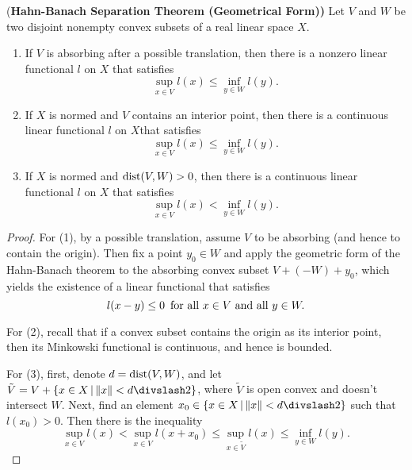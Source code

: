 \begin{theorem}{(\bf Hahn-Banach Separation Theorem (Geometrical Form))}
  Let $V$ and $W$ be two disjoint nonempty convex subsets of a real linear space $X$.
  \begin{enumerate}
    \item If $V$ is absorbing after a possible translation, then there is a nonzero linear functional $l$ on $X$ that satisfies
    \begin{equation*}
        \sup_{x\in V}l(x)\leq\inf_{y\in W}l(y).
      \end{equation*}
    \item If $X$ is normed and $V$ contains an interior point, then there is a continuous linear functional $l$ on $X$that satisfies
    \begin{equation*}
      \sup_{x\in V}l(x)\leq\inf_{y\in W}l(y).
    \end{equation*}
    \item If $X$ is normed and $\operatorname{dist}(V, W)>0$, then there is a continuous linear functional $l$ on $X$ that satisfies
    \begin{equation*}
      \sup_{x\in V}l(x)<\inf_{y\in W}l(y).
    \end{equation*}
  \end{enumerate}
\end{theorem}

\begin{proof}
  For (1), by a possible translation, assume $V$ to be absorbing (and hence to contain the origin). Then fix a point $y_0\in W$ and apply the geometric form of the Hahn-Banach theorem to the absorbing convex subset $V+(-W)+y_0$, which yields the existence of a linear functional that satisfies
  \begin{equation*}
    l(x-y)\leq 0\text{\enskip for all }x\in V\text{ and all }y\in W.
  \end{equation*}

  For (2), recall that if a convex subset contains the origin as its interior point, then its Minkowski functional is continuous, and hence is bounded.

  For (3), first, denote $d=\operatorname{dist}(V, W)$, and let $\tilde V = V + \{x\in X\VERT \NORM x< d\DIV 2\}$, where $\tilde V$ is open convex and doesn't intersect $W$. Next, find an element $x_0\in \{x\in X\VERT \NORM x< d\DIV 2\}$ such that $l(x_0)>0$. Then there is the inequality
  \begin{equation*}
    \sup_{x\in V}l(x)<\sup_{x\in V}l(x+x_0)\leq\sup_{x\in\tilde V}l(x)\leq \inf_{y\in W}l(y).
  \end{equation*}
\end{proof}

